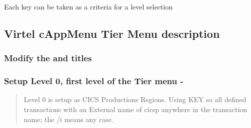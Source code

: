 \documentclass[letterpaper,10pt,english]{sphinxmanual}
\begin{document}
Each key can be taken as a criteria for a level selection


\subsection{Virtel cAppMenu Tier Menu description}
\label{\detokenize{Customization:virtel-cappmenu-tier-menu-description}}


\subsubsection{Modify the  and  titles}
\label{\detokenize{Customization:modify-the-main-and-sub-titles}}
\begin{sphinxVerbatim}[commandchars=\\\{\}]
   

\PYG{p}{[}\PYG{p}{]}  
\end{sphinxVerbatim}


\subsubsection{Setup Level 0, first level of the Tier menu - }
\label{\detokenize{Customization:setup-level-0-first-level-of-the-tier-menu-cics-production-regions}}\begin{quote}

Level 0 is setup as CICS Productions Regions. Using KEY  so all defined transactions with an External name of cicsp anywhere in the transaction name; the /i means any case.
\end{quote}
\end{document}
